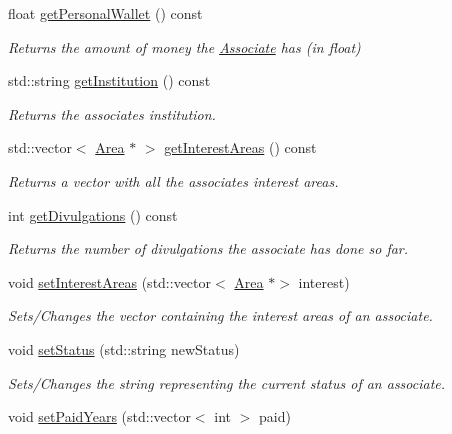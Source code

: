 \begin{DoxyCompactItemize}
float \mbox{\hyperlink{classAssociate_a75ad2c5af6c2a21fb1828f785751f390}{get\+Personal\+Wallet}} () const
\begin{DoxyCompactList}\small\item\em Returns the amount of money the \mbox{\hyperlink{classAssociate}{Associate}} has (in float) \end{DoxyCompactList}\item 
std\+::string \mbox{\hyperlink{classAssociate_acef0ddff899cbca55e3b19abc67f1800}{get\+Institution}} () const
\begin{DoxyCompactList}\small\item\em Returns the associate\textquotesingle{}s institution. \end{DoxyCompactList}\item 
std\+::vector$<$ \mbox{\hyperlink{classArea}{Area}} $\ast$ $>$ \mbox{\hyperlink{classAssociate_ac53645c77c48f2439dc3a5f8eb9ef530}{get\+Interest\+Areas}} () const
\begin{DoxyCompactList}\small\item\em Returns a vector with all the associate\textquotesingle{}s interest areas. \end{DoxyCompactList}\item 
int \mbox{\hyperlink{classAssociate_a2ee36cec1d42559fdd1f9afe7ff85b2b}{get\+Divulgations}} () const
\begin{DoxyCompactList}\small\item\em Returns the number of divulgations the associate has done so far. \end{DoxyCompactList}\item 
void \mbox{\hyperlink{classAssociate_a5b416da0898fd5dda854eb0027e9e8a1}{set\+Interest\+Areas}} (std\+::vector$<$ \mbox{\hyperlink{classArea}{Area}} $\ast$$>$ interest)
\begin{DoxyCompactList}\small\item\em Sets/\+Changes the vector containing the interest areas of an associate. \end{DoxyCompactList}\item 
void \mbox{\hyperlink{classAssociate_af44a5e1cc41845a60f17a4d23352448d}{set\+Status}} (std\+::string new\+Status)
\begin{DoxyCompactList}\small\item\em Sets/\+Changes the string representing the current status of an associate. \end{DoxyCompactList}\item 
void \mbox{\hyperlink{classAssociate_a474ef6683f939d3ccec7bbbf1bd03f96}{set\+Paid\+Years}} (std\+::vector$<$ int $>$ paid)
$$
\end{DoxyCompactItemize}
